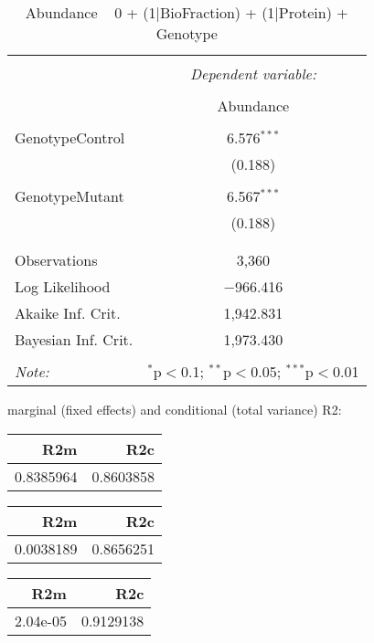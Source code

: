 \documentclass[11pt]{report}
\begin{document}
\begin{table}[!htbp] \centering 
  \caption{Abundance ~ 0 + (1|BioFraction) + (1|Protein) + Genotype} 
  \label{} 
\begin{tabular}{@{\extracolsep{5pt}}lc} 
\\[-1.8ex]\hline 
\hline \\[-1.8ex] 
 & \multicolumn{1}{c}{\textit{Dependent variable:}} \\ 
\cline{2-2} 
\\[-1.8ex] & Abundance \\ 
\hline \\[-1.8ex] 
 GenotypeControl & 6.576$^{***}$ \\ 
  & (0.188) \\ 
  & \\ 
 GenotypeMutant & 6.567$^{***}$ \\ 
  & (0.188) \\ 
  & \\ 
\hline \\[-1.8ex] 
Observations & 3,360 \\ 
Log Likelihood & $-$966.416 \\ 
Akaike Inf. Crit. & 1,942.831 \\ 
Bayesian Inf. Crit. & 1,973.430 \\ 
\hline 
\hline \\[-1.8ex] 
\textit{Note:}  & \multicolumn{1}{r}{$^{*}$p$<$0.1; $^{**}$p$<$0.05; $^{***}$p$<$0.01} \\ 
\end{tabular} 
\end{table} 
marginal (fixed effects) and conditional (total variance) R2:

\begin{tabular}{r|r}
\hline
R2m & R2c\\
\hline
0.8385964 & 0.8603858\\
\hline
\end{tabular}

\begin{tabular}{r|r}
\hline
R2m & R2c\\
\hline
0.0038189 & 0.8656251\\
\hline
\end{tabular}

\begin{tabular}{r|r}
\hline
R2m & R2c\\
\hline
2.04e-05 & 0.9129138\\
\hline
\end{tabular}
\end{document}
